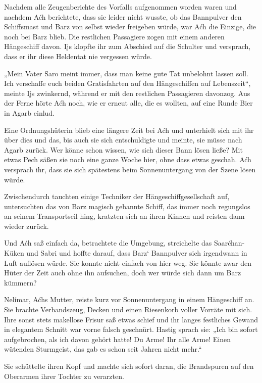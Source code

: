 Nachdem alle Zeugenberichte des Vorfalls aufgenommen worden waren und nachdem Aćh berichtete, dass sie leider nicht wusste, ob das Bannpulver den Schiffsmast und Barz von selbst wieder freigeben würde, war Aćh die Einzige, die noch bei Barz blieb. Die restlichen Passagiere zogen mit einem anderen Hängeschiff davon. Ijs klopfte ihr zum Abschied auf die Schulter und versprach, dass er ihr diese Heldentat nie vergessen würde.

„Mein Vater Saro meint immer, dass man keine gute Tat unbelohnt lassen soll. Ich verschaffe euch beiden Gratisfahrten auf den Hängeschiffen auf Lebenszeit“, meinte Ijs zwinkernd, während er mit den restlichen Passagieren davonzog. Aus der Ferne hörte Aćh noch, wie er erneut alle, die es wollten, auf eine Runde Bier in Agarb einlud.

Eine Ordnungshüterin blieb eine längere Zeit bei Aćh und unterhielt sich mit ihr über dies und das, bis auch sie sich entschuldigte und meinte, sie müsse nach Agarb zurück. Wer könne schon wissen, wie sich dieser Bann lösen ließe? Mit etwas Pech säßen sie noch eine ganze Woche hier, ohne dass etwas geschah. Aćh versprach ihr, dass sie sich spätestens beim Sonnenuntergang von der Szene lösen würde.

Zwischendurch tauchten einige Techniker der Hängeschiffgesellschaft auf, untersuchten das von Barz magisch gebannte Schiff, das immer noch regungslos an seinem Transportseil hing, kratzten sich an ihren Kinnen und reisten dann wieder zurück.

Und Aćh saß einfach da, betrachtete die Umgebung, streichelte das Saarćhan-Küken und Sabri und hoffte darauf, dass Barz‘ Bannpulver sich irgendwann in Luft auflösen würde. Sie konnte nicht einfach von hier weg. Sie könnte zwar den Hüter der Zeit auch ohne ihn aufsuchen, doch wer würde sich dann um Barz kümmern?\bigskip







Nelímar, Aćhs Mutter, reiste kurz vor Sonnenuntergang in einem Hängeschiff an. Sie brachte Verbandszeug, Decken und einen Riesenkorb voller Vorräte mit sich. Ihre sonst stets makellose Frisur saß etwas schief und ihr langes festliches Gewand in elegantem Schnitt war vorne falsch geschnürt. Hastig sprach sie: „Ich bin sofort aufgebrochen, als ich davon gehört hatte! Du Arme! Ihr alle Arme! Einen wütenden Sturmgeist, das gab es schon seit Jahren nicht mehr.“

Sie schüttelte ihren Kopf und machte sich sofort daran, die Brandspuren auf den Oberarmen ihrer Tochter zu verarzten.

